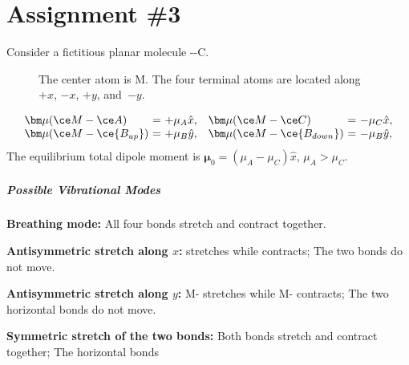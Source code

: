 
\section{Assignment \#3}

\begin{problem}[note =  
  IR Activity of Vibrational Modes in a Fictitious Molecule]\leavevmode
  Consider a fictitious planar molecule --\ce C.
  \begin{figure}[htbp]
    \centering
    \caption{The center atom is \ce M. The four terminal atoms are located
      along $+x$, $-x$, $+y$, and~$-y$.}
  \end{figure}
  \[\begin{array}{l@{~}c@{~}l@{\quad}l@{~}c@{~}l}
    \bm\mu(\ce M - \ce A)         & = & +\mu_A\hat x, &
    \bm\mu(\ce M - \ce C)         & = & -\mu_C\hat x,\\
    \bm\mu(\ce M - \ce{B_{up}})   & = & +\mu_B\hat y, &
    \bm\mu(\ce M - \ce{B_{down}}) & = & -\mu_B\hat y,
  \end{array}\]
  The equilibrium total dipole moment is $\bm \mu_0 = (\mu_A - \mu_C) \hat x$,
  $\mu_A > \mu_C$.
  \subparagraph{Possible Vibrational Modes}
  \begin{enumext}
    \item \textbf{Breathing mode:} All four bonds stretch and contract together.
    \item \textbf{Antisymmetric stretch along $x$:}
     stretches while  contracts; The two 
    bonds do not move.
    \item \textbf{Antisymmetric stretch along $y$:}
    \ce M- stretches while
    \ce M- contracts; The two horizontal bonds do not move.
    \item \textbf{Symmetric stretch of the two  bonds:}
    Both  bonds stretch and contract together; The horizontal bonds

\end{enumext}
\end{problem}
